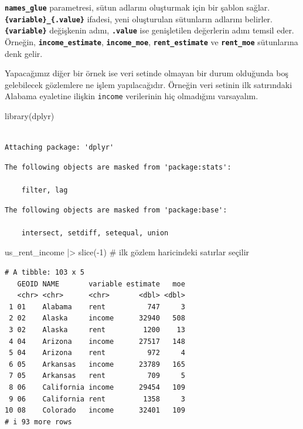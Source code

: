 \documentclass[
  letterpaper,
  DIV=11,
  numbers=noendperiod]{scrreprt}
\newenvironment{Shaded}{\begin{snugshade}}{\end{snugshade}}
\newcommand{\CommentTok}[1]{\textcolor[rgb]{0.37,0.37,0.37}{#1}}
\newcommand{\DecValTok}[1]{\textcolor[rgb]{0.68,0.00,0.00}{#1}}
\newcommand{\FunctionTok}[1]{\textcolor[rgb]{0.28,0.35,0.67}{#1}}
\newcommand{\NormalTok}[1]{\textcolor[rgb]{0.00,0.23,0.31}{#1}}
\newcommand{\SpecialCharTok}[1]{\textcolor[rgb]{0.37,0.37,0.37}{#1}}
\begin{document}
\textbf{\texttt{names\_glue}} parametresi, sütun adlarını oluşturmak
için bir şablon sağlar. \textbf{\texttt{\{variable\}\_\{.value\}}}
ifadesi, yeni oluşturulan sütunların adlarını belirler.
\textbf{\texttt{\{variable\}}} değişkenin adını,
\textbf{\texttt{.value}} ise genişletilen değerlerin adını temsil eder.
Örneğin, \textbf{\texttt{income\_estimate}},
\textbf{\texttt{income\_moe}}, \textbf{\texttt{rent\_estimate}} ve
\textbf{\texttt{rent\_moe}} sütunlarına denk gelir.

Yapacağımız diğer bir örnek ise veri setinde olmayan bir durum olduğunda
boş gelebilecek gözlemlere ne işlem yapılacağıdır. Örneğin veri setinin
ilk satırındaki Alabama eyaletine ilişkin \texttt{income} verilerinin
hiç olmadığını varsayalım.

\begin{Shaded}
\begin{Highlighting}[]
\FunctionTok{library}\NormalTok{(dplyr)}
\end{Highlighting}
\end{Shaded}

\begin{verbatim}

Attaching package: 'dplyr'
\end{verbatim}

\begin{verbatim}
The following objects are masked from 'package:stats':

    filter, lag
\end{verbatim}

\begin{verbatim}
The following objects are masked from 'package:base':

    intersect, setdiff, setequal, union
\end{verbatim}

\begin{Shaded}
\begin{Highlighting}[]
\NormalTok{us\_rent\_income }\SpecialCharTok{|\textgreater{}} 
  \FunctionTok{slice}\NormalTok{(}\SpecialCharTok{{-}}\DecValTok{1}\NormalTok{) }\CommentTok{\# ilk gözlem haricindeki satırlar seçilir}
\end{Highlighting}
\end{Shaded}

\begin{verbatim}
# A tibble: 103 x 5
   GEOID NAME       variable estimate   moe
   <chr> <chr>      <chr>       <dbl> <dbl>
 1 01    Alabama    rent          747     3
 2 02    Alaska     income      32940   508
 3 02    Alaska     rent         1200    13
 4 04    Arizona    income      27517   148
 5 04    Arizona    rent          972     4
 6 05    Arkansas   income      23789   165
 7 05    Arkansas   rent          709     5
 8 06    California income      29454   109
 9 06    California rent         1358     3
10 08    Colorado   income      32401   109
# i 93 more rows
\end{verbatim}
\end{document}
